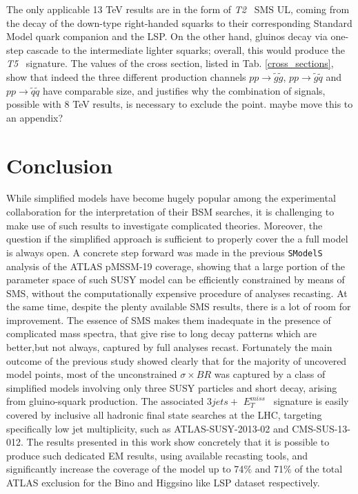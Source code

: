 \documentclass[a4paper,11pt]{article}
\newcommand{\MET}{{ $E_T ^{miss}$}}
\newcommand{\SMO}{\texttt{SModelS\xspace}}
\newcommand{\Ttwo}{ \textit{T2}}
\newcommand{\Tfive}{ \textit{T5}}
\begin{document}
%
The only applicable 13 TeV results are in the form of \Ttwo~ SMS UL, coming from the decay of the down-type right-handed squarks to their corresponding Standard Model quark companion and the LSP. On the other hand, gluinos decay via one-step cascade to the intermediate lighter squarks; overall, this would produce the \Tfive~ signature. The values of the cross section, listed in Tab. \ref{cross_sections}, show that indeed the three different production channels $pp \rightarrow \tilde g \tilde g$, $pp \rightarrow \tilde g \tilde q$ and $pp \rightarrow \tilde q \tilde q$ have comparable size, and justifies why the combination of signals, possible with 8 TeV results, is necessary to exclude the point.
{\color{blue} maybe move this to an appendix?}

%
\section{Conclusion}\label{sec:conclusion}
While simplified models have become hugely popular among the experimental collaboration for the interpretation of their BSM searches, it is challenging to make use of such results to investigate complicated theories. Moreover, the question if the simplified approach is sufficient to properly cover the a full model is always open. A concrete step forward was made in the previous \SMO~ analysis of the ATLAS pMSSM-19 coverage, showing that a large portion of the parameter space of such SUSY model can be efficiently constrained by means of SMS, without the computationally expensive procedure of analyses recasting. At the same time, despite the plenty available SMS results, there is a lot of room for improvement. The essence of SMS makes them inadequate in the presence of complicated mass spectra, that give rise to long decay patterns which are better,but not always, captured by full analyses recast. Fortunately the main outcome of the previous study showed clearly that for the majority of uncovered model points, most of the unconstrained $\sigma \times BR$ was captured by a class of simplified models involving only three SUSY particles and short decay, arising from gluino-squark production. The associated $3jets+$\MET~ signature is easily covered by inclusive all hadronic final state searches at the LHC, targeting specifically low jet multiplicity, such as ATLAS-SUSY-2013-02 and CMS-SUS-13-012. The results presented in this work show concretely that it is possible to produce such dedicated EM results, using available recasting tools, and significantly increase the coverage of the model up to 74$\%$ and 71$\%$ of the total ATLAS exclusion for the Bino and Higgsino like LSP dataset respectively. 
\end{document}
